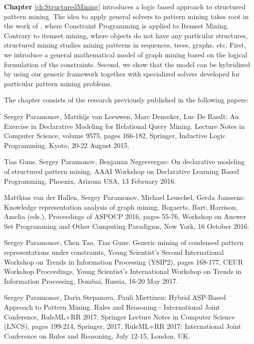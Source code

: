 \textbf{Chapter} \ref{ch:StructuredMining} introduces a logic
based approach to structured pattern mining. The idea to apply general
solvers to pattern mining takes root in the work of
\textcite{declrativeapproach}, where Constraint Programming is applied to
Itemset Mining. Contrary to itemset mining, where objects do not have
any particular structures, structured mining studies mining patterns
in sequences, trees, graphs, etc. First, we introduce a general
mathematical model of graph mining based on the logical formulation of
the constraints. Second, we show that the model can be hybridized by
using our generic framework together with specialized solvers
developed for particular pattern mining problems.

The chapter consists of the research previously published in the following papers:
\begin{addmargin}[2em]{2em}
Sergey Paramonov, Matthijs van Leeuwen, Marc Denecker, Luc De Raedt:
An Exercise in Declarative Modeling for Relational Query Mining.
Lecture Notes in Computer Science, volume 9575, pages 166-182,
    Springer, Inductive Logic Programming, Kyoto, 20-22 August 2015.

Tias Guns, Sergey Paramonov, Benjamin Negrevergne: On declarative
    modeling of structured pattern mining, AAAI Workshop on
    Declarative Learning Based Programming, Phoenix, Arizona USA, 13
    February 2016.

Matthias van der Hallen, Sergey Paramonov, Michael Leuschel, Gerda
    Janssens: Knowledge representation analysis of graph mining,
    Bogaerts, Bart; Harrison, Amelia (eds.), Proceedings of ASPOCP
    2016, pages 55-76, Workshop on Answer Set Programming and Other
    Computing Paradigms, New York, 16 October 2016.

Sergey Paramonov, Chen Tao, Tias Guns: Generic mining of condensed
    pattern representations under constraints, Young Scientist's
    Second International Workshop on Trends in Information Processing
    (YSIP2), pages 168-177, CEUR Workshop Proceedings, Young
    Scientist's International Workshop on Trends in Information
    Processing, Dombai, Russia, 16-20 May 2017.

Sergey Paramonov, Daria Stepanova, Pauli Miettinen:
Hybrid ASP-Based Approach to Pattern Mining.  
Rules and Reasoning - International Joint Conference, RuleML+RR 2017,
    Springer Lecture Notes in Computer Science (LNCS), pages 199-214,
    Springer, 2017, RuleML+RR 2017: International Joint Conference on
    Rules and Reasoning, July 12-15, London, UK.
\end{addmargin}

